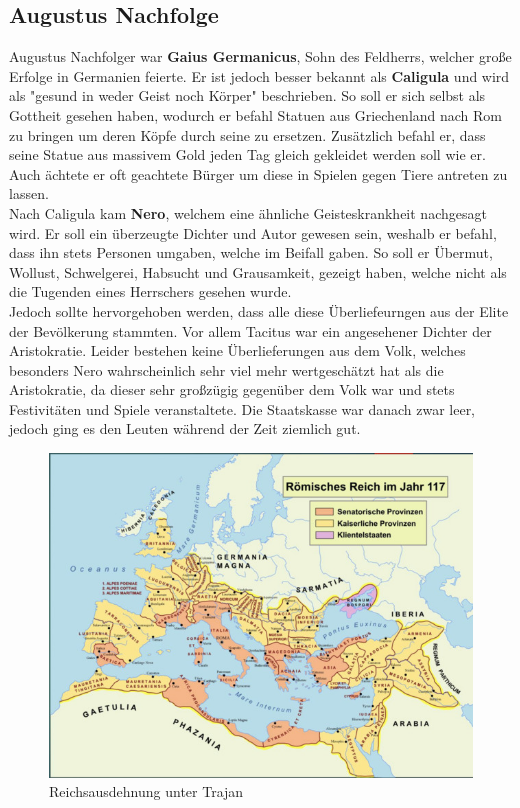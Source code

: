 \documentclass{article}
\begin{document}
	\subsection{Augustus Nachfolge}
	Augustus Nachfolger war \textbf{Gaius Germanicus}, Sohn des Feldherrs, welcher große Erfolge in Germanien feierte. Er ist jedoch besser bekannt als \textbf{Caligula} und wird als "gesund in weder Geist noch Körper" beschrieben. So soll er sich selbst als Gottheit gesehen haben, wodurch er befahl Statuen aus Griechenland nach Rom zu bringen um deren Köpfe durch seine zu ersetzen. Zusätzlich befahl er, dass seine Statue aus massivem Gold jeden Tag gleich gekleidet werden soll wie er. Auch ächtete er oft geachtete Bürger um diese in Spielen gegen Tiere antreten zu lassen. \\
	Nach Caligula kam \textbf{Nero}, welchem eine ähnliche Geisteskrankheit nachgesagt wird. Er soll ein überzeugte Dichter und Autor gewesen sein, weshalb er befahl, dass ihn stets Personen umgaben, welche im Beifall gaben. So soll er Übermut, Wollust, Schwelgerei, Habsucht und Grausamkeit, gezeigt haben, welche nicht als die Tugenden eines Herrschers gesehen wurde. \\
	Jedoch sollte hervorgehoben werden, dass alle diese Überliefeurngen aus der Elite der Bevölkerung stammten. Vor allem Tacitus war ein angesehener Dichter der Aristokratie. Leider bestehen keine Überlieferungen aus dem Volk, welches besonders Nero wahrscheinlich sehr viel mehr wertgeschätzt hat als die Aristokratie, da dieser sehr großzügig gegenüber dem Volk war und stets Festivitäten und Spiele veranstaltete. Die Staatskasse war danach zwar leer, jedoch ging es den Leuten während der Zeit ziemlich gut. \\
	\begin{figure}
	\includegraphics{Trajan_Reich.jpg}
	\caption{Reichsausdehnung unter Trajan}
	\end{figure}
\end{document}
